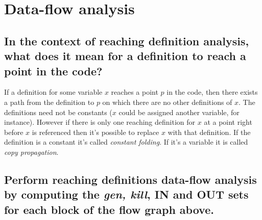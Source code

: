 \newpage
\section{Data-flow analysis}
\subsection{In the context of reaching definition analysis, what does it mean for a definition to reach a point in the code?}
If a definition for some variable $x$ reaches a point $p$ in the code, then there exists a path from the definition to $p$ on which there are no other definitions of $x$.
The definitions need not be constants ($x$ could be assigned another variable, for instance).
However if there is only one reaching definition for $x$ at a point right before $x$ is referenced then it's possible to replace $x$ with that definition.
If the definition is a constant it's called \emph{constant folding}.
If it's a variable it is called \emph{copy propagation}.

\subsection{Perform reaching definitions data-flow analysis by computing the \emph{gen, kill}, IN and OUT sets for each block of the flow graph above.}



